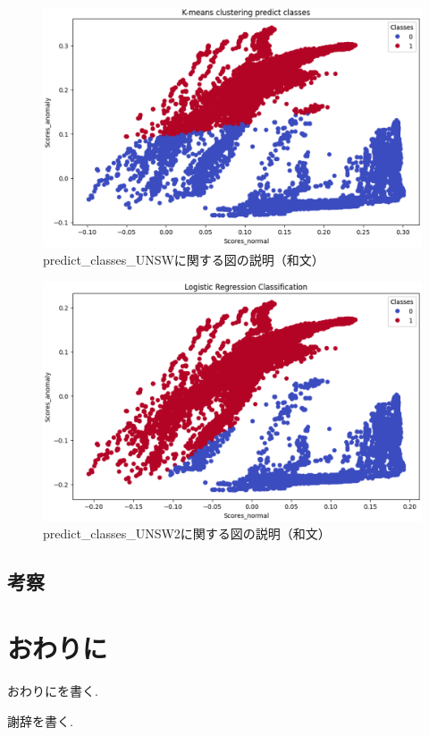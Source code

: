 \documentclass{css}
\begin{document}
\begin{figure}[tb]
    \centering
    \includegraphics[width=\linewidth]{pictures/eps/predict_classes_UNSW.eps}
    \caption{predict\_classes\_UNSWに関する図の説明（和文）}
    \label{fig:predict_classes_UNSW}
\end{figure}

\begin{figure}[tb]
    \centering
    \includegraphics[width=\linewidth]{pictures/eps/predict_classes_UNSW2.eps}
    \caption{predict\_classes\_UNSW2に関する図の説明（和文）}
    \label{fig:predict_classes_UNSW2}
\end{figure}

\subsection{考察}


\section{おわりに}
おわりにを書く.

\begin{acknowledgment}
謝辞を書く.
\end{acknowledgment}

\begin{thebibliography}{10}

\end{thebibliography}
\end{document}
